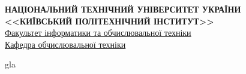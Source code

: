 \documentclass[main.tex]{subfiles}
\begin{document}

\begin{specialpage}
  \MakeUppercase{\textbf{Національний технічний університет України <<Київський політехнічний інститут>>}}\\
  \underline{Факультет інформатики та обчислювальної техніки}\\
  \underline{Кафедра обчислювальної техніки}

  \vspace*{\fill}

  gla

  \vspace*{\fill}
  \mypagefooter{}
\end{specialpage}
\end{document}
